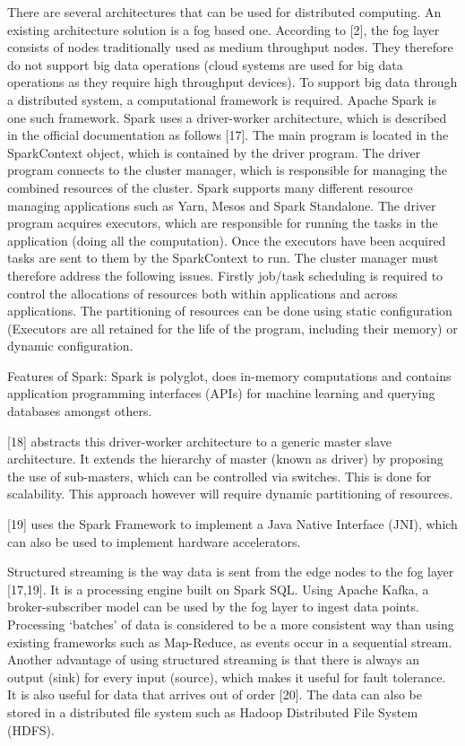 There are several architectures that can be used for distributed computing. An existing architecture solution is a fog based one. According to [2], the fog layer consists of nodes traditionally used as medium throughput nodes. They therefore do not support big data operations (cloud systems are used for big data operations as they require high throughput devices). To support big data through a distributed system, a computational framework is required. Apache Spark is one such framework. Spark uses a driver-worker architecture, which is described in the official documentation as follows [17]. The main program is located in the SparkContext object, which is contained by the driver program. The driver program connects to the cluster manager, which is responsible for managing the combined resources of the cluster. Spark supports many different resource managing applications such as Yarn, Mesos and Spark Standalone. The driver program acquires executors, which are responsible for running the tasks in the application (doing all the computation).  Once the executors have been acquired tasks are sent to them by the SparkContext to run. The cluster manager must therefore address the following issues. Firstly job/task scheduling is required to control the allocations of resources both within applications and across applications. The partitioning of resources can be done using static configuration (Executors are all retained for the life of the program, including their memory) or dynamic configuration.  

Features of Spark: Spark is polyglot, does in-memory computations and contains application programming interfaces (APIs) for machine learning and querying databases amongst others.  

[18] abstracts this driver-worker architecture to a generic master slave architecture. It extends the hierarchy of master (known as driver) by proposing the use of sub-masters, which can be controlled via switches. This is done for scalability. This approach however will require dynamic partitioning of resources.  

[19] uses the Spark Framework to implement a Java Native Interface (JNI), which can also be used to implement hardware accelerators.  

Structured streaming is the way data is sent from the edge nodes to the fog layer [17,19].  It is a processing engine built on Spark SQL. Using Apache Kafka, a broker-subscriber model can be used by the fog layer to ingest data points. Processing ‘batches’ of data is considered to be a more consistent way than using existing frameworks such as Map-Reduce, as events occur in a sequential stream. Another advantage of using structured streaming is that there is always an output (sink) for every input (source), which makes it useful for fault tolerance. It is also useful for data that arrives out of order [20]. The data can also be stored in a distributed file system such as Hadoop Distributed File System (HDFS). 


